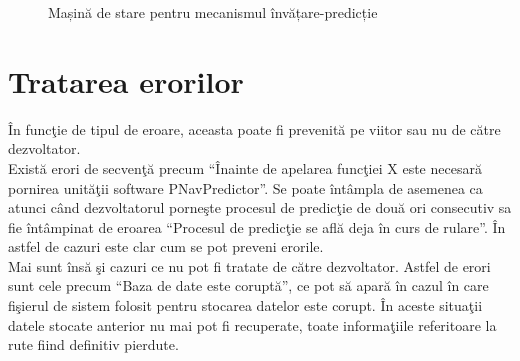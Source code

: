 \begin{figure}[h!]
  \centering
  \caption{Mașină de stare pentru mecanismul învățare-predicție}
  \end{figure}		
	
\section{Tratarea erorilor}
În funcţie de tipul de eroare, aceasta poate fi prevenită pe viitor sau nu de către dezvoltator.
\vspace{6pt}
\\Există erori de secvenţă precum ``Înainte de apelarea funcţiei X este necesară pornirea unităţii software PNavPredictor''. Se poate întâmpla de asemenea ca atunci când dezvoltatorul porneşte procesul de predicţie de două ori consecutiv sa fie întâmpinat de eroarea ``Procesul de predicţie se află deja în curs de rulare''.
În astfel de cazuri este clar cum se pot preveni erorile.
\vspace{6pt}
\\Mai sunt însă şi cazuri ce nu pot fi tratate de către dezvoltator. Astfel de erori sunt cele precum ``Baza de date este coruptă'', ce pot să apară în cazul în care fişierul de sistem folosit pentru stocarea datelor este corupt. În aceste situaţii datele stocate anterior nu mai pot fi recuperate, toate informaţiile referitoare la rute fiind definitiv pierdute.



